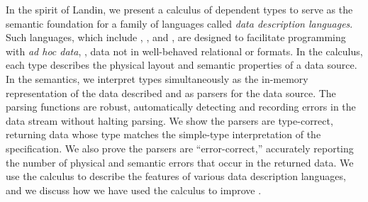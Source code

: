 In the spirit of Landin, we present a calculus of dependent types to
serve as the semantic foundation for a family of languages called
\textit{data description languages}.  Such languages, which include
\pads{}, \datascript{}, and \packettypes{}, are designed to facilitate
programming with \textit{ad hoc data}, \ie{}, data not in well-behaved
relational or \xml{} formats. In the calculus, each type describes the
physical layout and semantic properties of a data source. In the
semantics, we interpret types simultaneously as the in-memory
representation of the data described and as parsers for the
data source. The parsing functions are robust, automatically detecting
and recording errors in the data stream without halting parsing.  
We show the parsers are type-correct, returning data whose type matches the simple-type interpretation of the specification. We also prove the parsers
are ``error-correct,'' accurately reporting the number of physical and
semantic errors that occur in the returned data.  We use the calculus
to describe the features of various data description languages, and we
discuss how we have used the calculus to improve \pads{}.

